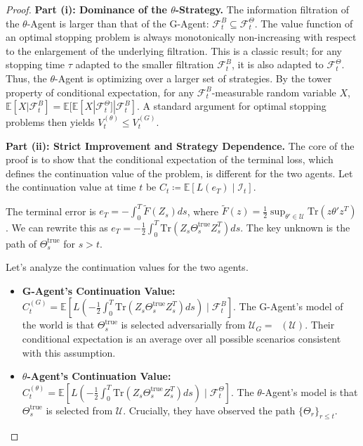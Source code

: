 \documentclass[12pt, letterpaper]{amsart}
\newcommand{\Ucal}{\mathcal{U}}
\newcommand{\Tr}{\mathrm{Tr}}
\DeclareMathOperator*{\overlineconv}{\overline{conv}}
\theoremstyle{plain}
\theoremstyle{definition}
\theoremstyle{remark}
\numberwithin{equation}{section} %
\begin{document}
\begin{proof}
\noindent\textbf{Part (i): Dominance of the $\theta$-Strategy.}
The information filtration of the $\theta$-Agent is larger than that of the G-Agent: $\mathcal{F}_t^B \subseteq \mathcal{F}_t^\Theta$. The value function of an optimal stopping problem is always monotonically non-increasing with respect to the enlargement of the underlying filtration. This is a classic result; for any stopping time $\tau$ adapted to the smaller filtration $\mathcal{F}_t^B$, it is also adapted to $\mathcal{F}_t^\Theta$. Thus, the $\theta$-Agent is optimizing over a larger set of strategies. By the tower property of conditional expectation, for any $\mathcal{F}_t^B$-measurable random variable $X$, $\mathbb{E}[X|\mathcal{F}_t^B] = \mathbb{E}[\mathbb{E}[X|\mathcal{F}_t^\Theta]|\mathcal{F}_t^B]$. A standard argument for optimal stopping problems then yields $V_t^{(\theta)} \le V_t^{(G)}$.

\vspace{1ex}
\noindent\textbf{Part (ii): Strict Improvement and Strategy Dependence.}
The core of the proof is to show that the conditional expectation of the terminal loss, which defines the continuation value of the problem, is different for the two agents. Let the continuation value at time $t$ be $C_t \coloneqq \mathbb{E}[L(e_T) \mid \mathcal{I}_t]$.

The terminal error is $e_T = -\int_0^T \tilde{F}(Z_s)ds$, where $\tilde{F}(z) = \frac{1}{2}\sup_{\theta' \in \Ucal}\Tr(z\theta'z^T)$. We can rewrite this as $e_T = -\frac{1}{2}\int_0^T \Tr(Z_s \Theta_s^{\text{true}} Z_s^T)ds$. The key unknown is the path of $\Theta_s^{\text{true}}$ for $s>t$.

Let's analyze the continuation values for the two agents.
\begin{itemize}
    \item \textbf{G-Agent's Continuation Value:} $C_t^{(G)} = \mathbb{E}\left[L\left(-\frac{1}{2}\int_0^T \Tr(Z_s \Theta_s^{\text{true}} Z_s^T)ds\right) \mid \mathcal{F}_t^B\right]$. The G-Agent's model of the world is that $\Theta_s^{\text{true}}$ is selected adversarially from $\Ucal_G = \overlineconv(\Ucal)$. Their conditional expectation is an average over all possible scenarios consistent with this assumption.
    
    \item \textbf{$\theta$-Agent's Continuation Value:} $C_t^{(\theta)} = \mathbb{E}\left[L\left(-\frac{1}{2}\int_0^T \Tr(Z_s \Theta_s^{\text{true}} Z_s^T)ds\right) \mid \mathcal{F}_t^\Theta\right]$. The $\theta$-Agent's model is that $\Theta_s^{\text{true}}$ is selected from $\Ucal$. Crucially, they have observed the path $\{\Theta_r\}_{r\le t}$.
\end{itemize}


\end{proof}
\end{document}

